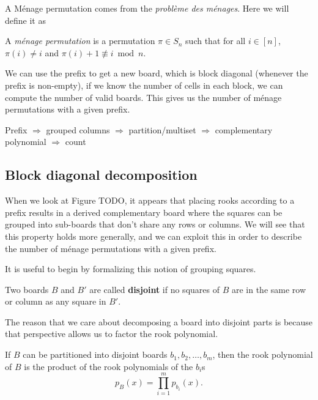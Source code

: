 A M\'enage permutation comes from the \textit{problème des ménages}. %
Here we will define it as
\begin{definition}
  A \textit{m\'enage permutation} is a permutation $\pi \in S_n$ such that for
  all $i \in [n]$,
  $\pi(i) \neq i$ and
  $\pi(i) + 1 \not\equiv i \bmod n$.
\end{definition}

We can use the prefix to get a new board, which is block diagonal
(whenever the prefix is non-empty), if we know the number of cells in each
block, we can compute the number of valid boards. This gives us the number of
m\'enage permutations with a given prefix.

Prefix $\Rightarrow$ grouped columns $\Rightarrow$ partition/multiset $\Rightarrow$ complementary polynomial $\Rightarrow$ count

\subsection{Block diagonal decomposition}
When we look at Figure TODO, it appears that placing rooks according to a prefix
results in a derived complementary board where the squares can be grouped into
sub-boards that don't share any rows or columns. We will see that this property
holds more generally, and we can exploit this in order to describe the number
of m\'enage permutations with a given prefix.

It is useful to begin by formalizing this notion of grouping squares.
\begin{definition}
  Two boards $B$ and $B'$ are called \textbf{disjoint} if no squares of $B$ are
  in the same row or column as any square in $B'$.
\end{definition}

The reason that we care about decomposing a board into disjoint parts
is because that perspective allows us to factor the rook polynomial.
\begin{lemma}
  If $B$ can be partitioned into disjoint boards $b_1, b_2, \dots, b_m$,
  then the rook polynomial of $B$ is the product of the rook polynomials of
  the $b_i$s \[
    p_B(x) = \prod_{i=1}^m p_{b_i}(x).
  \]
\end{lemma}

